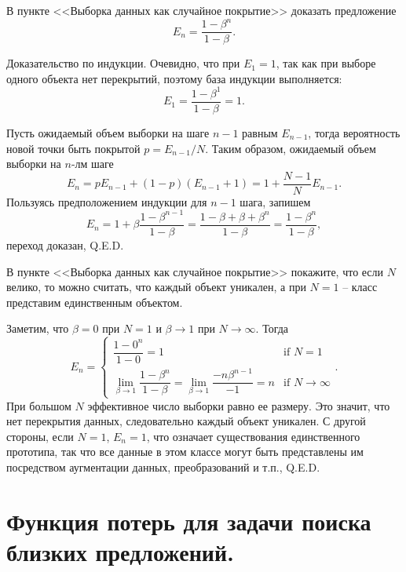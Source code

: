 \begin{problem}
    В пункте <<Выборка данных как случайное покрытие>>  доказать предложение
    \[
        E_n=\dfrac{1-\beta^n}{1-\beta}.
    \]
\end{problem}

\begin{solution}
    Доказательство по индукции. Очевидно, что при $E_1=1$, так как при выборе одного объекта нет перекрытий, поэтому база индукции выполняется:
    \[
        E_1=\dfrac{1-\beta^1}{1-\beta}=1.
    \]

    Пусть ожидаемый объем выборки на шаге $n-1$ равным $E_{n-1}$, тогда вероятность новой точки быть покрытой $p=E_{n-1}/N$. Таким образом, ожидаемый объем выборки на $n$-лм шаге
    \[
        E_n=pE_{n-1}+(1-p)(E_{n-1}+1)=1+\dfrac{N-1}{N}E_{n-1}.
    \]
    Пользуясь предположением индукции для $n-1$ шага, запишем
    \[
        E_n=1+\beta\dfrac{1-\beta^{n-1}}{1-\beta}=\dfrac{1-\beta+\beta+\beta^{n}}{1-\beta}=\dfrac{1-\beta^{n}}{1-\beta},
    \]
    переход доказан, Q.E.D.
\end{solution}

\begin{problem}
    В пункте <<Выборка данных как случайное покрытие>>  покажите, что если $N$ велико, то можно считать, что каждый объект уникален, а при $N=1$ -- класс представим единственным объектом.
\end{problem}

\begin{solution}
    Заметим, что $\beta=0$ при $N=1$ и $\beta \to 1$ при $N \to \infty$. Тогда
    \[
        E_n=\begin{cases}
            \dfrac{1-0^n}{1-0}=1 & \text{if } N=1 \\
            \lim\limits_{\beta \to 1}\dfrac{1-\beta^n}{1-\beta}=\lim\limits_{\beta \to 1}\dfrac{-n\beta^{n-1}}{-1}=n & \text{if } N \to \infty
        \end{cases}.
    \]
    При большом $N$ эффективное число выборки равно ее размеру. Это значит, что нет перекрытия данных, следовательно каждый объект уникален. С другой стороны, если $N=1$, $E_n=1$, что означает существования единственного прототипа, так что все данные в этом классе могут быть представлены им посредством аугментации данных, преобразований и т.п., Q.E.D.
\end{solution}


\section*{Функция потерь для задачи поиска близких предложений.}

